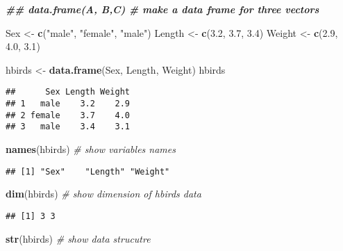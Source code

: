 \documentclass[
]{article}
\newenvironment{Shaded}{\begin{snugshade}}{\end{snugshade}}
\newcommand{\CommentTok}[1]{\textcolor[rgb]{0.56,0.35,0.01}{\textit{#1}}}
\newcommand{\DocumentationTok}[1]{\textcolor[rgb]{0.56,0.35,0.01}{\textbf{\textit{#1}}}}
\newcommand{\FloatTok}[1]{\textcolor[rgb]{0.00,0.00,0.81}{#1}}
\newcommand{\FunctionTok}[1]{\textcolor[rgb]{0.13,0.29,0.53}{\textbf{#1}}}
\newcommand{\NormalTok}[1]{#1}
\newcommand{\OtherTok}[1]{\textcolor[rgb]{0.56,0.35,0.01}{#1}}
\newcommand{\StringTok}[1]{\textcolor[rgb]{0.31,0.60,0.02}{#1}}
\begin{document}
\begin{Shaded}
\begin{Highlighting}[]
\DocumentationTok{\#\# data.frame(A, B,C) \# make a data frame for three vectors}

\NormalTok{Sex }\OtherTok{\textless{}{-}} \FunctionTok{c}\NormalTok{(}\StringTok{"male"}\NormalTok{, }\StringTok{"female"}\NormalTok{, }\StringTok{"male"}\NormalTok{)}
\NormalTok{Length }\OtherTok{\textless{}{-}} \FunctionTok{c}\NormalTok{(}\FloatTok{3.2}\NormalTok{, }\FloatTok{3.7}\NormalTok{, }\FloatTok{3.4}\NormalTok{)}
\NormalTok{Weight }\OtherTok{\textless{}{-}} \FunctionTok{c}\NormalTok{(}\FloatTok{2.9}\NormalTok{, }\FloatTok{4.0}\NormalTok{, }\FloatTok{3.1}\NormalTok{)}

\NormalTok{hbirds }\OtherTok{\textless{}{-}} \FunctionTok{data.frame}\NormalTok{(Sex, Length, Weight)}
\NormalTok{hbirds}
\end{Highlighting}
\end{Shaded}

\begin{verbatim}
##      Sex Length Weight
## 1   male    3.2    2.9
## 2 female    3.7    4.0
## 3   male    3.4    3.1
\end{verbatim}

\begin{Shaded}
\begin{Highlighting}[]
\FunctionTok{names}\NormalTok{(hbirds) }\CommentTok{\# show variables names}
\end{Highlighting}
\end{Shaded}

\begin{verbatim}
## [1] "Sex"    "Length" "Weight"
\end{verbatim}

\begin{Shaded}
\begin{Highlighting}[]
\FunctionTok{dim}\NormalTok{(hbirds) }\CommentTok{\# show dimension of hbirds data}
\end{Highlighting}
\end{Shaded}

\begin{verbatim}
## [1] 3 3
\end{verbatim}

\begin{Shaded}
\begin{Highlighting}[]
\FunctionTok{str}\NormalTok{(hbirds) }\CommentTok{\# show data strucutre}
\end{Highlighting}
\end{Shaded}
\end{document}
